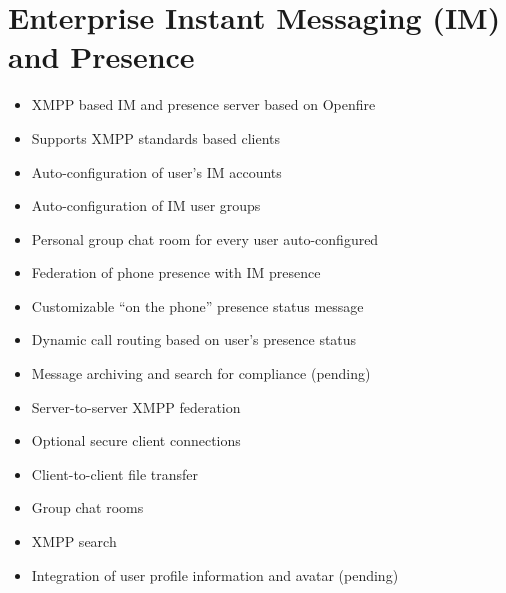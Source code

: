 \documentclass[letterpaper,10pt,english]{sphinxmanual}
\begin{document}
\section{Enterprise Instant Messaging (IM) and Presence}
\label{\detokenize{features:enterprise-instant-messaging-im-and-presence}}\begin{itemize}
\item {} 
XMPP based IM and presence server based on Openfire

\item {} 
Supports XMPP standards based clients

\item {} 
Auto-configuration of user’s IM accounts

\item {} 
Auto-configuration of IM user groups

\item {} 
Personal group chat room for every user auto-configured

\item {} 
Federation of phone presence with IM presence

\item {} 
Customizable “on the phone” presence status message

\item {} 
Dynamic call routing based on user’s presence status

\item {} 
Message archiving and search for compliance (pending)

\item {} 
Server-to-server XMPP federation

\item {} 
Optional secure client connections

\item {} 
Client-to-client file transfer

\item {} 
Group chat rooms

\item {} 
XMPP search

\item {} 
Integration of user profile information and avatar (pending)

\end{itemize}
\end{document}
